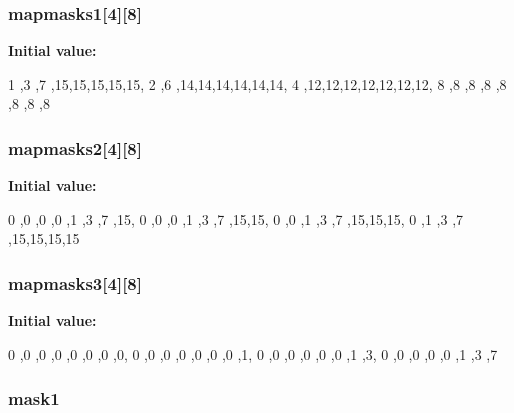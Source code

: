 \label{OLDSCALE_8C_ab21e1dd6476595095fa335682b93094e}
\hypertarget{OLDSCALE_8C_ac94f1a50e42c5f020505d6c1b77c4f5e}{
\subsubsection[{mapmasks1}]{ {\bf mapmasks1}\mbox{[}4\mbox{]}\mbox{[}8\mbox{]}}}
\label{OLDSCALE_8C_ac94f1a50e42c5f020505d6c1b77c4f5e}
{\bfseries Initial value:}
\begin{DoxyCode}
 {
{1 ,3 ,7 ,15,15,15,15,15},
{2 ,6 ,14,14,14,14,14,14},
{4 ,12,12,12,12,12,12,12},
{8 ,8 ,8 ,8 ,8 ,8 ,8 ,8} }
\end{DoxyCode}
\hypertarget{OLDSCALE_8C_a41f7ecdc70d7ae35ee9d6594f950d37c}{
\subsubsection[{mapmasks2}]{ {\bf mapmasks2}\mbox{[}4\mbox{]}\mbox{[}8\mbox{]}}}
\label{OLDSCALE_8C_a41f7ecdc70d7ae35ee9d6594f950d37c}
{\bfseries Initial value:}
\begin{DoxyCode}
 {
{0 ,0 ,0 ,0 ,1 ,3 ,7 ,15},
{0 ,0 ,0 ,1 ,3 ,7 ,15,15},
{0 ,0 ,1 ,3 ,7 ,15,15,15},
{0 ,1 ,3 ,7 ,15,15,15,15} }
\end{DoxyCode}
\hypertarget{OLDSCALE_8C_ab39851371b2e506e131e50d79d8550d8}{
\subsubsection[{mapmasks3}]{ {\bf mapmasks3}\mbox{[}4\mbox{]}\mbox{[}8\mbox{]}}}
\label{OLDSCALE_8C_ab39851371b2e506e131e50d79d8550d8}
{\bfseries Initial value:}
\begin{DoxyCode}
 {
{0 ,0 ,0 ,0 ,0 ,0 ,0 ,0},
{0 ,0 ,0 ,0 ,0 ,0 ,0 ,1},
{0 ,0 ,0 ,0 ,0 ,0 ,1 ,3},
{0 ,0 ,0 ,0 ,0 ,1 ,3 ,7} }
\end{DoxyCode}
\hypertarget{OLDSCALE_8C_a522ae19258cf30475ed90bb76819efb1}{
\subsubsection[{mask1}]{ {\bf mask1}}}
